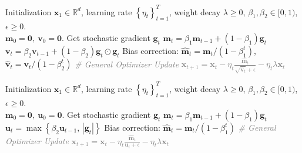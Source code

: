 \documentclass{article}
\def \x {\mathbf{x}}
\def \v {\mathbf{v}}
\def \g {\mathbf{g}}
\def \u {\mathbf{u}}
\def \R {\mathbb{R}}
\def \m {\mathbf{m}}
\newcommand{\cbrac}[1]{\left\{#1\right\}}
\def\0{\bm{0}}
\begin{document}
\begin{algorithm}[htbp]
    \caption{AdamW~\citep{kingma15adam,loshchilov2019adamw}}
    \label{alg:adamw}
    \begin{algorithmic}[1]
     Initialization $\x_1\in\R^d$, learning rate $\cbrac{\eta_t}_{t=1}^T$, weight decay $\lambda\ge0$, $\beta_1,\beta_2\in[0,1)$, $\epsilon\ge0$.\\
     $\m_0=\0,\ \v_0=\0$.
        \STATE Get stochastic gradient $\g_t$
        \STATE $\m_t = \beta_1 \m_{t-1} + (1-\beta_1)\g_t$
        \STATE $\v_t = \beta_2 \v_{t-1} + (1-\beta_2)\g_t\odot\g_t$
        \STATE Bias correction: $\widehat{\m}_t = \m_t/(1-\beta_1^t)$, $\widehat{\v}_t = \v_t/(1-\beta_2^t)$
        \STATE \textcolor{gray}{\itshape \# General Optimizer Update}
        \STATE \textcolor{gray}{$\x_{t+1} = \x_t - \eta_t \frac{\widehat{\m}_t}{\sqrt{\widehat{\v}_t}+\epsilon} - \eta_t\lambda\x_t$}
    \ENDFOR
\end{algorithmic}
\end{algorithm}

\begin{algorithm}[htbp]
    \caption{AdaMax with Decoupled Weight Decay~\citep{kingma15adam,loshchilov2019adamw}}
    \label{alg:adamax}
    \begin{algorithmic}[1]
     Initialization $\x_1\in\R^d$, learning rate $\cbrac{\eta_t}_{t=1}^T$, weight decay $\lambda\ge0$, $\beta_1,\beta_2\in[0,1)$, $\epsilon\ge0$.\\
     $\m_0=\0,\ \u_0=\0$.
        \STATE Get stochastic gradient $\g_t$
        \STATE $\m_t = \beta_1 \m_{t-1} + (1-\beta_1)\g_t$
        \STATE $\u_t = \max\cbrac{\beta_2 \u_{t-1},\, |\g_t|}$
        \STATE Bias correction: $\widehat{\m}_t = \m_t/(1-\beta_1^t)$
        \STATE \textcolor{gray}{\itshape \# General Optimizer Update}
        \STATE \textcolor{gray}{$\x_{t+1} = \x_t - \eta_t \frac{\widehat{\m}_t}{\u_t+\epsilon} - \eta_t\lambda\x_t$}
    \ENDFOR
\end{algorithmic}
\end{algorithm}
\end{document}
